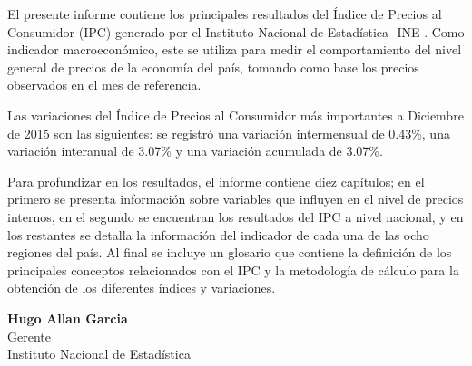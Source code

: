 El presente informe contiene los principales resultados del Índice de Precios al Consumidor (IPC) generado por el Instituto
Nacional de Estadística -INE-. Como indicador macroeconómico, este se utiliza para medir el comportamiento del nivel
general de precios de la economía del país, tomando como base los precios observados en el mes de referencia.

Las variaciones del Índice de Precios al Consumidor más importantes a Diciembre de 2015 son las siguientes: se registró
una variación intermensual de 0.43\%, una variación interanual de 3.07\% y una variación acumulada de 3.07\%.

Para profundizar en los resultados, el informe contiene diez capítulos; en el primero se presenta información sobre variables
que influyen en el nivel de precios internos, en el segundo se encuentran los resultados del IPC a nivel nacional,
y en los restantes se detalla la información del indicador de cada una de las ocho regiones del país. Al final se incluye un
glosario que contiene la definición de los principales conceptos relacionados con el IPC y la metodología de cálculo para la
obtención de los diferentes índices y variaciones.

\begin{center}
\textbf{Hugo Allan Garcia}\\
Gerente\\
Instituto Nacional de Estadística
\end{center}